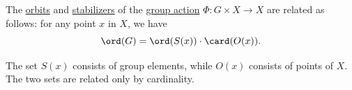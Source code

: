 \begin{theorem}\label{thm:orbit_stabilizer_theorem}
  The \hyperref[def:group_action_orbit]{orbits} and \hyperref[def:group_action_stabilizer]{stabilizers} of the \hyperref[def:group_action]{group action} \( \Phi: G \times X \to X \) are related as follows: for any point \( x \) in \( X \), we have
  \begin{equation}\label{eq:thm:orbit_stabilizer_theorem}
    \ord(G) = \ord(S(x)) \cdot \card(O(x)).
  \end{equation}
\end{theorem}
\begin{comments}
  \item The set \( S(x) \) consists of group elements, while \( O(x) \) consists of points of \( X \).  The two sets are related only by cardinality.
\end{comments}
